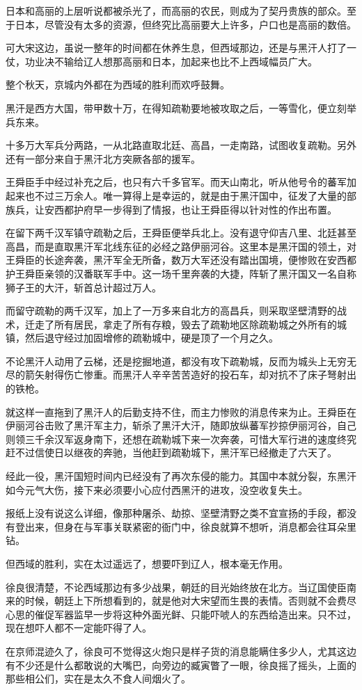 日本和高丽的上层听说都被杀光了，而高丽的农民，则成为了契丹贵族的部众。至于日本，尽管没有太多的资源，但终究比高丽要大上许多，户口也是高丽的数倍。

可大宋这边，虽说一整年的时间都在休养生息，但西域那边，还是与黑汗人打了一仗，功业决不输给辽人想那高丽和日本，加起来也比不上西域幅员广大。

整个秋天，京城内外都在为西域的胜利而欢呼鼓舞。

黑汗是西方大国，带甲数十万，在得知疏勒要地被攻取之后，一等雪化，便立刻举兵东来。

十多万大军兵分两路，一从北路直取北廷、高昌，一走南路，试图收复疏勒。另外还有一部分来自于黑汗北方突厥各部的援军。

王舜臣手中经过补充之后，也只有六千多官军。而天山南北，听从他号令的蕃军加起来也不过三万余人。唯一算得上是幸运的，就是由于黑汗国中，征发了大量的部族兵，让安西都护府早一步得到了情报，也让王舜臣得以针对性的作出布置。

在留下两千汉军镇守疏勒之后，王舜臣便举兵北上。没有退守仰吉八里、北廷甚至高昌，而是直取黑汗军北线东征的必经之路伊丽河谷。这里本是黑汗国的领土，对王舜臣的长途奔袭，黑汗军全无所备，数万大军还没有踏出国境，便惨败在安西都护王舜臣亲领的汉番联军手中。这一场千里奔袭的大捷，阵斩了黑汗国又一名自称狮子王的大汗，斩首总计超过万人。

而留守疏勒的两千汉军，加上了一万多来自北方的高昌兵，则采取坚壁清野的战术，迁走了所有居民，拿走了所有存粮，毁去了疏勒地区除疏勒城之外所有的城镇，然后退守经过加固增修的疏勒城中，硬是顶了一个月之久。

不论黑汗人动用了云梯，还是挖掘地道，都没有攻下疏勒城，反而为城头上无穷无尽的箭矢射得伤亡惨重。而黑汗人辛辛苦苦造好的投石车，却对抗不了床子弩射出的铁枪。

就这样一直拖到了黑汗人的后勤支持不住，而主力惨败的消息传来为止。王舜臣在伊丽河谷击败了黑汗军主力，斩杀了黑汗大汗，随即放纵蕃军抄掠伊丽河谷，自己则领三千余汉军返身南下，还想在疏勒城下来一次奔袭，可惜大军行进的速度终究赶不过信使日以继夜的奔驰，当他赶到疏勒城下，黑汗军已经撤走了六天了。

经此一役，黑汗国短时间内已经没有了再次东侵的能力。其国中本就分裂，东黑汗如今元气大伤，接下来必须要小心应付西黑汗的进攻，没空收复失土。

报纸上没有说这么详细，像那种屠杀、劫掠、坚壁清野之类不宜宣扬的手段，都没有登出来，但身在与军事关联紧密的衙门中，徐良就算不想听，消息都会往耳朵里钻。

但西域的胜利，实在太过遥远了，想要吓到辽人，根本毫无作用。

徐良很清楚，不论西域那边有多少战果，朝廷的目光始终放在北方。当辽国使臣南来的时候，朝廷上下所想看到的，就是他对大宋望而生畏的表情。否则就不会费尽心思的催促军器监早一步将这种外面光鲜、只能吓唬人的东西给造出来。只不过，现在想吓人都不一定能吓得了人。

在京师混迹久了，徐良可不觉得这火炮只是样子货的消息能瞒住多少人，尤其这边有不少还是什么都敢说的大嘴巴，向旁边的臧寅瞥了一眼，徐良摇了摇头，上面的那些相公们，实在是太久不食人间烟火了。
